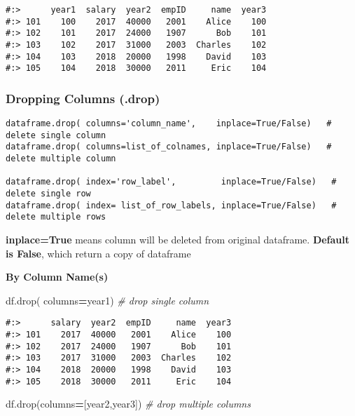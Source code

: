 \documentclass[
]{book}
\newenvironment{Shaded}{\begin{snugshade}}{\end{snugshade}}
\newcommand{\CommentTok}[1]{\textcolor[rgb]{0.37,0.37,0.37}{\textit{#1}}}
\newcommand{\NormalTok}[1]{#1}
\newcommand{\OperatorTok}[1]{\textcolor[rgb]{0.43,0.43,0.43}{\textbf{#1}}}
\newcommand{\StringTok}[1]{\textcolor[rgb]{0.5,0.5,0.5}{#1}}
\begin{document}
\begin{verbatim}
#:>      year1  salary  year2  empID     name  year3
#:> 101    100    2017  40000   2001    Alice    100
#:> 102    101    2017  24000   1907      Bob    101
#:> 103    102    2017  31000   2003  Charles    102
#:> 104    103    2018  20000   1998    David    103
#:> 105    104    2018  30000   2011     Eric    104
\end{verbatim}

\hypertarget{dropping-columns-.drop}{%
\subsubsection{Dropping Columns (.drop)}\label{dropping-columns-.drop}}

\begin{verbatim}
dataframe.drop( columns='column_name',    inplace=True/False)   # delete single column
dataframe.drop( columns=list_of_colnames, inplace=True/False)   # delete multiple column

dataframe.drop( index='row_label',         inplace=True/False)   # delete single row
dataframe.drop( index= list_of_row_labels, inplace=True/False)   # delete multiple rows
\end{verbatim}

\textbf{inplace=True} means column will be deleted from original dataframe. \textbf{Default is False}, which return a copy of dataframe

\textbf{By Column Name(s)}

\begin{Shaded}
\begin{Highlighting}[]
\NormalTok{df.drop( columns}\OperatorTok{=}\StringTok{\textquotesingle{}year1\textquotesingle{}}\NormalTok{) }\CommentTok{\# drop single column}
\end{Highlighting}
\end{Shaded}

\begin{verbatim}
#:>      salary  year2  empID     name  year3
#:> 101    2017  40000   2001    Alice    100
#:> 102    2017  24000   1907      Bob    101
#:> 103    2017  31000   2003  Charles    102
#:> 104    2018  20000   1998    David    103
#:> 105    2018  30000   2011     Eric    104
\end{verbatim}

\begin{Shaded}
\begin{Highlighting}[]
\NormalTok{df.drop(columns}\OperatorTok{=}\NormalTok{[}\StringTok{\textquotesingle{}year2\textquotesingle{}}\NormalTok{,}\StringTok{\textquotesingle{}year3\textquotesingle{}}\NormalTok{])  }\CommentTok{\# drop multiple columns}
\end{Highlighting}
\end{Shaded}
\end{document}

